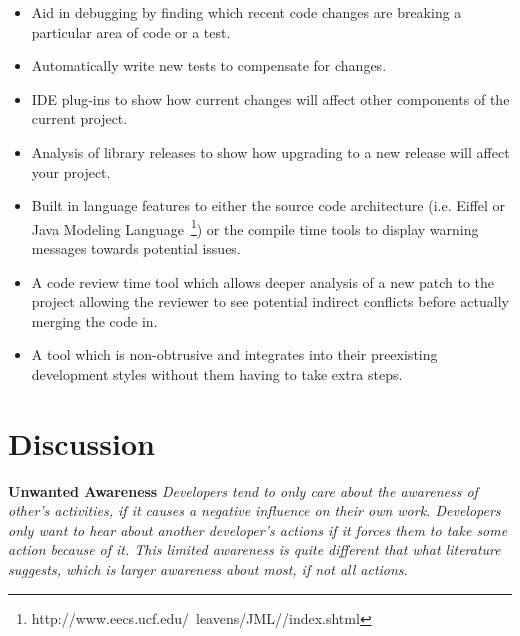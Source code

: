 \documentclass[conference]{IEEEtran}
\begin{document}
\begin{itemize}
	\item Aid in debugging by finding which recent code changes are breaking a particular area of code or a test.
	\item Automatically write new tests to compensate for changes.
	\item IDE plug-ins to show how current changes will affect other components of the current project.
	\item Analysis of library releases to show how upgrading to a new release will affect your project.
	\item Built in language features to either the source code architecture (i.e. Eiffel or 
				Java Modeling Language~\footnote{http://www.eecs.ucf.edu/~leavens/JML//index.shtml}) or the compile 
				time tools to display warning messages towards potential issues.
	\item A code review time tool which allows deeper analysis of a new patch to the project allowing the reviewer to see potential 
				indirect conflicts before actually merging the code in.
	\item A tool which is non-obtrusive and integrates into their preexisting development styles without them having to take extra steps.
\end{itemize}

\section{Discussion}
\label{sec:disc}

\textbf{Unwanted Awareness} \textit{Developers tend to only care about the awareness of other's activities, if it causes
a negative influence on their own work. Developers only want to hear about another developer's actions if it forces them
to take some action because of it. This limited awareness is quite different that what literature suggests, which is larger
awareness about most, if not all actions.}
\end{document}
